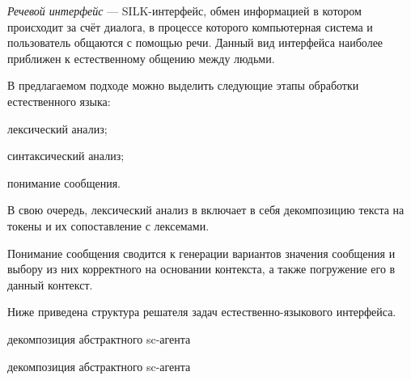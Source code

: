{\begin{SCn}


\end{SCn}

\textit{Речевой интерфейс} --- SILK-интерфейс, обмен информацией в котором происходит за счёт диалога, в процессе которого компьютерная система и пользователь общаются с помощью речи.
Данный вид интерфейса наиболее приближен к естественному общению между людьми.

В предлагаемом подходе можно выделить следующие этапы обработки естественного языка:
\begin{textitemize}
    \item лексический анализ;
    \item синтаксический анализ;
    \item понимание сообщения.
\end{textitemize}

В свою очередь, лексический анализ в включает в себя декомпозицию текста на токены и их сопоставление с лексемами.

Понимание сообщения сводится к генерации вариантов значения сообщения и выбору из них корректного на основании контекста, а также погружение его в данный контекст.

Ниже приведена структура решателя задач естественно-языкового интерфейса.

\begin{SCn}

    \begin{scnrelfromset}{декомпозиция абстрактного sc-агента}
        \begin{scnindent}
            \begin{scnrelfromset}{декомпозиция абстрактного sc-агента}
            \end{scnrelfromset}
        \end{scnindent}
    \end{scnrelfromset}

\end{SCn}

}
